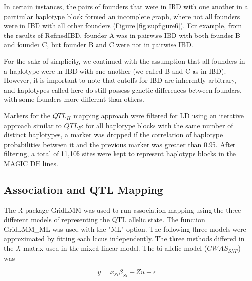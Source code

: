 \documentclass[9pt,twocolumn,twoside]{gsag3jnl}
\begin{document}
In certain instances, the pairs of founders that were in IBD with one another in a particular haplotype block formed an incomplete graph, where  not all founders were in IBD with all other founders (Figure \ref{fig:supfigure6}).
For example, from the results of RefinedIBD, founder A was in pairwise IBD with both founder B and founder C, but founder B and C were not in pairwise IBD.

For the sake of simplicity, we continued with the assumption that all founders in a haplotype were in IBD with one another (we called B and C as in IBD).
However, it is important to note that cutoffs for IBD are inherently arbitrary, and haplotypes called here do still possess genetic differences between founders, with some founders more different than others.

Markers for the $QTL_H$ mapping approach were filtered for LD using an iterative approach similar to $QTL_F$: for all haplotype blocks with the same number of distinct haplotypes, a marker was dropped if the correlation of haplotype probabilities between it and the previous marker was greater than 0.95.
After filtering, a total of 11,105 sites were kept to represent haplotype blocks in the MAGIC DH lines.

\subsection{Association and QTL Mapping}
The R package GridLMM \citep{Runcie} was used to run association mapping using the three different models of representing the QTL allelic state.
The function GridLMM\_ML was used with the "ML" option.
The following three models were approximated by fitting each locus independently.
The three methods differed in the $X$ matrix used in the mixed linear model.
The bi-allelic model ($GWAS_{SNP}$) was

\begin{equation}
\label{eqn:gridlmm1}
 y = x_{Si}{\beta_{Si}} + Zu + \epsilon
\end{equation}
\end{document}
